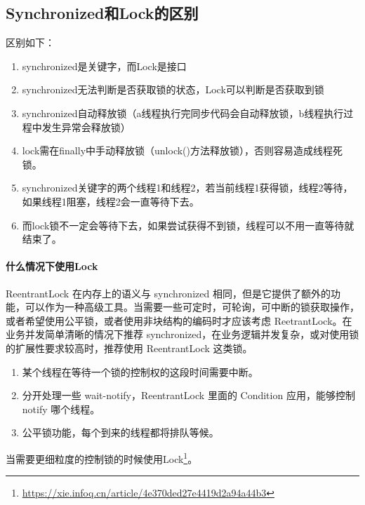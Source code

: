 \documentclass[../../../interview-questions.tex]{subfiles}
\begin{document}
\subsection{Synchronized和Lock的区别}

区别如下：

\begin{enumerate}
    \item {synchronized是关键字，而Lock是接口}
    \item {synchronized无法判断是否获取锁的状态，Lock可以判断是否获取到锁}
    \item {synchronized自动释放锁（a线程执行完同步代码会自动释放锁，b线程执行过程中发生异常会释放锁）}
    \item {lock需在finally中手动释放锁（unlock()方法释放锁），否则容易造成线程死锁。}
    \item {synchronized关键字的两个线程1和线程2，若当前线程1获得锁，线程2等待，如果线程1阻塞，线程2会一直等待下去。}
    \item {而lock锁不一定会等待下去，如果尝试获得不到锁，线程可以不用一直等待就结束了。}
\end{enumerate}

\paragraph{什么情况下使用Lock}

ReentrantLock 在内存上的语义与 synchronized 相同，但是它提供了额外的功能，可以作为一种高级工具。当需要一些可定时，可轮询，可中断的锁获取操作，或者希望使用公平锁，或者使用非块结构的编码时才应该考虑 ReetrantLock。在业务并发简单清晰的情况下推荐 synchronized，在业务逻辑并发复杂，或对使用锁的扩展性要求较高时，推荐使用 ReentrantLock 这类锁。

\begin{enumerate}
    \item {某个线程在等待一个锁的控制权的这段时间需要中断。}
    \item {分开处理一些 wait-notify，ReentrantLock 里面的 Condition 应用，能够控制 notify 哪个线程。}
    \item {公平锁功能，每个到来的线程都将排队等候。}
\end{enumerate}

当需要更细粒度的控制锁的时候使用Lock\footnote{\url{https://xie.infoq.cn/article/4e370ded27e4419d2a94a44b3}}。
\end{document}
